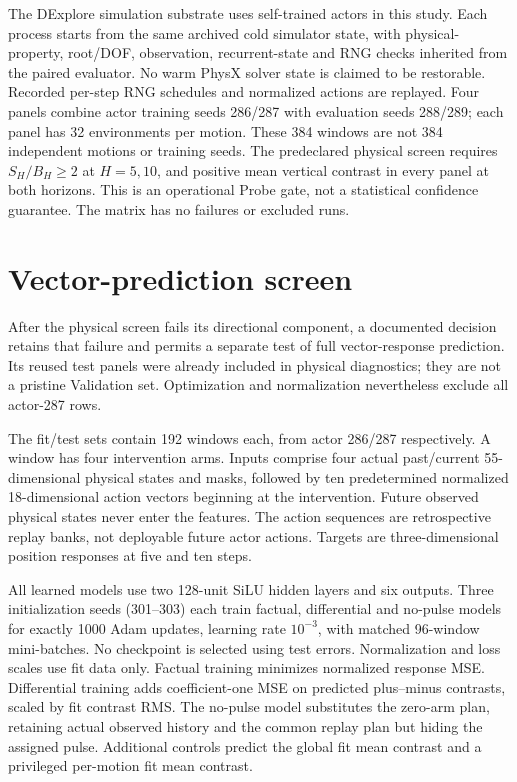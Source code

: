 \documentclass[10pt]{article}
\begin{document}
The DExplore simulation substrate \cite{xu2025} uses self-trained actors in this study.
Each process starts from the same archived cold simulator state, with physical-property,
root/DOF, observation, recurrent-state and RNG checks inherited from the paired evaluator.
No warm PhysX solver state is claimed to be restorable. Recorded per-step RNG schedules
and normalized actions are replayed. Four panels combine actor training seeds 286/287
with evaluation seeds 288/289; each panel has 32 environments per motion. These
384 windows are not 384 independent motions or training seeds. The predeclared physical
screen requires $S_H/B_H\ge2$ at $H=5,10$, and positive mean vertical contrast in every
panel at both horizons. This is an operational Probe gate, not a statistical confidence
guarantee. The matrix has no failures or excluded runs.

\section{Vector-prediction screen}
After the physical screen fails its directional component, a documented decision retains
that failure and permits a separate test of full vector-response prediction. Its reused
test panels were already included in physical diagnostics; they are not a pristine
Validation set. Optimization and normalization nevertheless exclude all actor-287 rows.

The fit/test sets contain 192 windows each, from actor 286/287 respectively. A window has
four intervention arms. Inputs comprise four actual past/current 55-dimensional physical
states and masks, followed by ten predetermined normalized 18-dimensional action vectors
beginning at the intervention. Future observed physical states never enter the features.
The action sequences are retrospective replay banks, not deployable future actor actions.
Targets are three-dimensional position responses at five and ten steps.

All learned models use two 128-unit SiLU hidden layers and six outputs. Three initialization
seeds (301--303) each train factual, differential and no-pulse models for exactly 1000 Adam
updates, learning rate $10^{-3}$, with matched 96-window mini-batches. No checkpoint is
selected using test errors. Normalization and loss scales use fit data only. Factual
training minimizes normalized response MSE. Differential training adds coefficient-one
MSE on predicted plus--minus contrasts, scaled by fit contrast RMS. The no-pulse model
substitutes the zero-arm plan, retaining actual observed history and the common replay
plan but hiding the assigned pulse. Additional controls predict the global fit mean
contrast and a privileged per-motion fit mean contrast.
\end{document}
